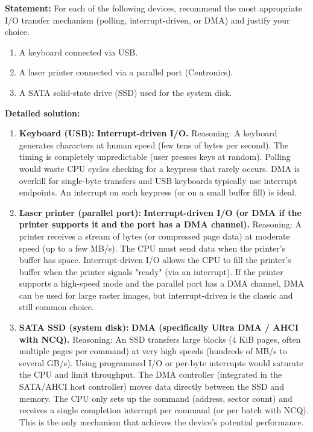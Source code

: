 \documentclass[11pt]{article}
\begin{document}
\begin{exoresolu}
\textbf{Statement:} For each of the following devices, recommend the most appropriate I/O transfer mechanism (polling, interrupt-driven, or DMA) and justify your choice.
\begin{enumerate}
\item A keyboard connected via USB.
\item A laser printer connected via a parallel port (Centronics).
\item A SATA solid-state drive (SSD) used for the system disk.
\end{enumerate}

\tcblower
\textbf{Detailed solution:}

\begin{enumerate}
\item \textbf{Keyboard (USB):} \textbf{Interrupt-driven I/O.}
Reasoning: A keyboard generates characters at human speed (few tens of bytes per second). The timing is completely unpredictable (user presses keys at random). Polling would waste CPU cycles checking for a keypress that rarely occurs. DMA is overkill for single-byte transfers and USB keyboards typically use interrupt endpoints. An interrupt on each keypress (or on a small buffer fill) is ideal.

\item \textbf{Laser printer (parallel port):} \textbf{Interrupt-driven I/O (or DMA if the printer supports it and the port has a DMA channel).}
Reasoning: A printer receives a stream of bytes (or compressed page data) at moderate speed (up to a few MB/s). The CPU must send data when the printer's buffer has space. Interrupt-driven I/O allows the CPU to fill the printer's buffer when the printer signals "ready" (via an interrupt). If the printer supports a high-speed mode and the parallel port has a DMA channel, DMA can be used for large raster images, but interrupt-driven is the classic and still common choice.

\item \textbf{SATA SSD (system disk):} \textbf{DMA (specifically Ultra DMA / AHCI with NCQ).}
Reasoning: An SSD transfers large blocks (4 KiB pages, often multiple pages per command) at very high speeds (hundreds of MB/s to several GB/s). Using programmed I/O or per-byte interrupts would saturate the CPU and limit throughput. The DMA controller (integrated in the SATA/AHCI host controller) moves data directly between the SSD and memory. The CPU only sets up the command (address, sector count) and receives a single completion interrupt per command (or per batch with NCQ). This is the only mechanism that achieves the device's potential performance.
\end{enumerate}
\end{exoresolu}
\end{document}
